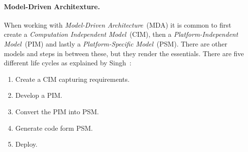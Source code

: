 \paragraph{Model-Driven Architexture.}
When working with \emph{Model-Driven Architecture}~(MDA) it is common to first create a
\emph{Computation Independent Model}~(CIM), then a \emph{Platform-Independent Model}~(PIM) and
lastly a \emph{Platform-Specific Model}~(PSM). There are other models and steps in between these,
but they render the essentials.
There are five different life cycles as explained by Singh~\cite{model-driven:singh09}:
\begin{enumerate}
  \item Create a CIM capturing requirements.
  \item Develop a PIM.
  \item Convert the PIM into PSM.
  \item Generate code form PSM.
  \item Deploy.
\end{enumerate}

